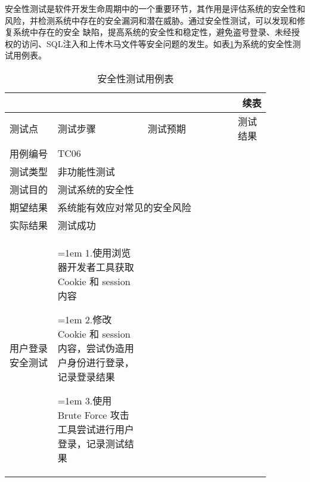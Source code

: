安全性测试是软件开发生命周期中的一个重要环节，其作用是评估系统的安全性和风险，并检测系统中存在的安全漏洞和潜在威胁。通过安全性测试，可以发现和修复系统中存在的安全
缺陷，提高系统的安全性和稳定性，避免盗号登录、未经授权的访问、SQL注入和上传木马文件等安全问题的发生。如表\ref{tab:安全性测试用例表}为系统的安全性测试用例表。

\begin{longtable}{|m{0.16\linewidth}|m{0.3\linewidth}|m{0.3\linewidth}|m{0.11\linewidth}|}

    \caption{安全性测试用例表}\label{tab:安全性测试用例表} \\
     \endfirsthead
     \multicolumn{4}{r}{ \bf{续表} } \\
     \hline
     测试点   & 测试步骤                          & 测试预期             & 测试结果 \\
     \hline
     \endhead
     \hline
     用例编号  & \multicolumn{3}{l|}{TC06} \\
     \hline
     测试类型  & \multicolumn{3}{l|}{非功能性测试}                                 \\
     \hline
     测试目的  & \multicolumn{3}{l|}{测试系统的安全性}                          \\
     \hline
     期望结果  & \multicolumn{3}{l|}{系统能有效应对常见的安全风险}                           \\
     \hline
     实际结果  & \multicolumn{3}{l|}{测试成功}                                 \\
     \hline
     用户登录安全测试 &  \parbox[t]{4.5cm}{\hangindent=1em 1.使用浏览器开发者工具获取 Cookie 和 session 内容} \vspace{-0.8mm}  
     \newline \parbox[t]{4.5cm}{\hangindent=1em 2.修改 Cookie 和 session 内容，尝试伪造用户身份进行登录，记录登录结果} \vspace{-0.8mm}
     \newline \parbox[t]{4.5cm}{\hangindent=1em 3.使用 Brute Force 攻击工具尝试进行用户登录，记录测试结果} \vspace{-0.8mm}
     

\end{longtable}
